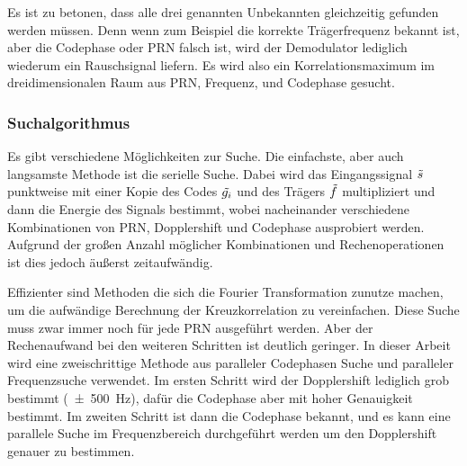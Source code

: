 Es ist zu betonen, dass alle drei genannten Unbekannten gleichzeitig gefunden werden müssen. Denn wenn zum Beispiel die korrekte Trägerfrequenz bekannt ist, aber die Codephase oder PRN falsch ist, wird der Demodulator lediglich wiederum ein Rauschsignal liefern. Es wird also ein Korrelationsmaximum im dreidimensionalen Raum aus PRN, Frequenz, und Codephase gesucht.

\subsubsection{Suchalgorithmus}
Es gibt verschiedene Möglichkeiten zur Suche. Die einfachste, aber auch langsamste Methode ist die serielle Suche. Dabei wird das Eingangssignal $\tilde{s}$ punktweise mit einer Kopie des Codes $\tilde{g_i}$ und des Trägers $\tilde{f}$ multipliziert und dann die Energie des Signals bestimmt, wobei nacheinander verschiedene Kombinationen von \gls{PRN}, Dopplershift und Codephase ausprobiert werden. Aufgrund der großen Anzahl möglicher Kombinationen und Rechenoperationen ist dies jedoch äußerst zeitaufwändig.

Effizienter sind Methoden die sich die Fourier Transformation zunutze machen, um die aufwändige Berechnung der Kreuzkorrelation zu vereinfachen. Diese Suche muss zwar immer noch für jede PRN ausgeführt werden. Aber der Rechenaufwand bei den weiteren Schritten ist deutlich geringer. 
In dieser Arbeit wird eine zweischrittige Methode aus paralleler Codephasen Suche und paralleler Frequenzsuche verwendet. Im ersten Schritt wird der Dopplershift lediglich grob bestimmt (\SI{\pm500}{\Hz}), dafür die Codephase aber mit hoher Genauigkeit bestimmt. Im zweiten Schritt ist dann die Codephase bekannt, und es kann eine parallele Suche im Frequenzbereich durchgeführt werden um den Dopplershift genauer zu bestimmen. 

